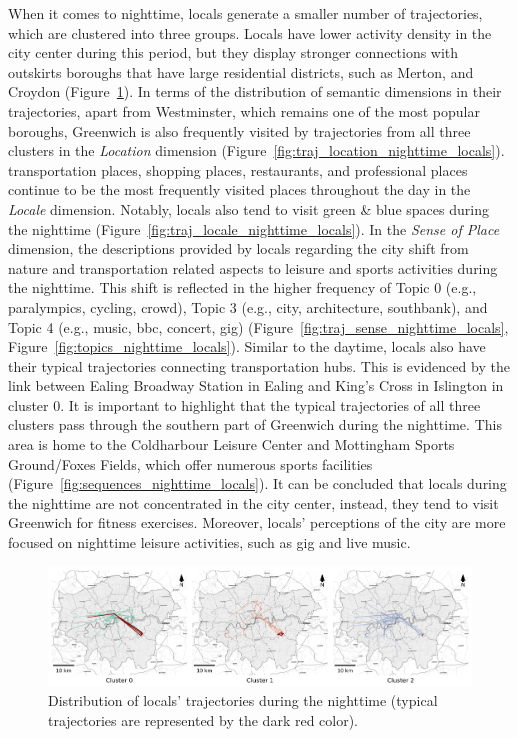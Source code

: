 \documentclass{article}
\theoremstyle{remark}
\begin{document}
When it comes to nighttime, locals generate a smaller number of trajectories, which are clustered into three groups. Locals have lower activity density in the city center during this period, but they display stronger connections with outskirts boroughs that have large residential districts, such as Merton, and Croydon (Figure~\ref{fig:traj_distribution_nighttime_locals}). In terms of the distribution of semantic dimensions in their trajectories, apart from Westminster, which remains one of the most popular boroughs, Greenwich is also frequently visited by trajectories from all three clusters in the \textit{Location} dimension (Figure~\ref{fig:traj_location_nighttime_locals}). transportation places, shopping places, restaurants, and professional places continue to be the most frequently visited places throughout the day in the \textit{Locale} dimension. Notably, locals also tend to visit green \& blue spaces during the nighttime (Figure~\ref{fig:traj_locale_nighttime_locals}). In the \textit{Sense of Place} dimension, the descriptions provided by locals regarding the city shift from nature and transportation related aspects to leisure and sports activities during the nighttime. This shift is reflected in the higher frequency of Topic 0 (e.g., paralympics, cycling, crowd), Topic 3 (e.g., city, architecture, southbank), and Topic 4 (e.g., music, bbc, concert, gig) (Figure~\ref{fig:traj_sense_nighttime_locals}, Figure~\ref{fig:topics_nighttime_locals}). Similar to the daytime, locals also have their typical trajectories connecting transportation hubs. This is evidenced by the link between Ealing Broadway Station in Ealing and King's Cross in Islington in cluster 0. It is important to highlight that the typical trajectories of all three clusters pass through the southern part of Greenwich during the nighttime. This area is home to the Coldharbour Leisure Center and Mottingham Sports Ground/Foxes Fields, which offer numerous sports facilities (Figure~\ref{fig:sequences_nighttime_locals}). It can be concluded that locals during the nighttime are not concentrated in the city center, instead, they tend to visit Greenwich for fitness exercises. Moreover, locals' perceptions of the city are more focused on nighttime leisure activities, such as gig and live music.

\begin{figure}[!h]
\centering
\includegraphics[width=1\textwidth]{figures/traj_distribution_nighttime_locals.png}
\caption{\label{fig:traj_distribution_nighttime_locals}Distribution of locals' trajectories during the nighttime (typical trajectories are represented by the dark red color).}
\end{figure}
\end{document}
